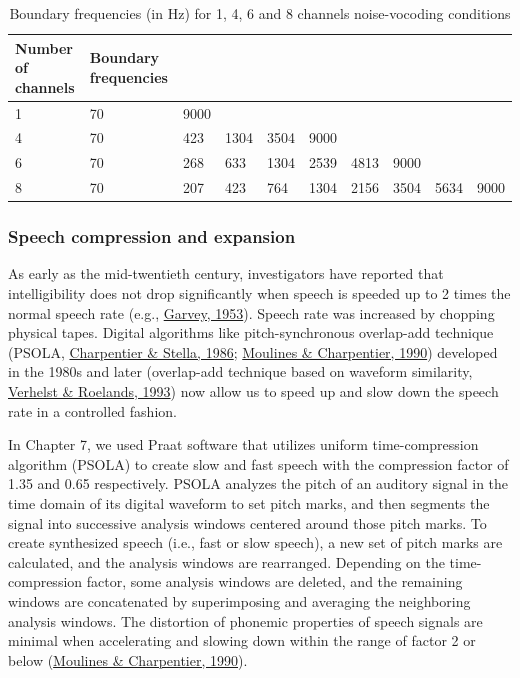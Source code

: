 \documentclass[a4paper, nobind]{templates/ociamthesis}
\begin{document}
\begin{table}[H]
\begin{center} 
\caption{Boundary frequencies (in Hz) for 1, 4, 6 and 8 channels noise-vocoding conditions} 
\label{frequencies} 
\vskip 0.12in
\begin{tabular}{llllllllll} 
\hline
Number of channels     &    Boundary frequencies \\
\hline
1   &   70    &   9000   &     &     &       &       &        &       &   \\

4   &   70    &   423   &   1304  &   3504  &   9000    &       &        &       &   \\

6   &   70    &   268   &   633   &   1304  &   2539    &   4813    &    9000    &       &   \\

8   &   70    &   207   &   423   &   764   &   1304    &   2156    &    3504    &   5634    &   9000\\
\hline
\end{tabular} 
\end{center} 
\end{table}

\hypertarget{compression-expansion}{%
\subsubsection{Speech compression and expansion}\label{compression-expansion}}

As early as the mid-twentieth century, investigators have reported that intelligibility does not drop significantly when speech is speeded up to 2 times the normal speech rate (e.g., \protect\hyperlink{ref-Garvey1953}{Garvey, 1953}).
Speech rate was increased by chopping physical tapes.
Digital algorithms like pitch-synchronous overlap-add technique (PSOLA, \protect\hyperlink{ref-Charpentier1986}{Charpentier \& Stella, 1986}; \protect\hyperlink{ref-Moulines1990}{Moulines \& Charpentier, 1990}) developed in the 1980s and later (overlap-add technique based on waveform similarity, \protect\hyperlink{ref-Verhelst1993}{Verhelst \& Roelands, 1993}) now allow us to speed up and slow down the speech rate in a controlled fashion.

In Chapter 7, we used Praat software that utilizes uniform time-compression algorithm (PSOLA) to create slow and fast speech with the compression factor of 1.35 and 0.65 respectively.
PSOLA analyzes the pitch of an auditory signal in the time domain of its digital waveform to set pitch marks, and then segments the signal into successive analysis windows centered around those pitch marks.
To create synthesized speech (i.e., fast or slow speech), a new set of pitch marks are calculated, and the analysis windows are rearranged.
Depending on the time-compression factor, some analysis windows are deleted, and the remaining windows are concatenated by superimposing and averaging the neighboring analysis windows.
The distortion of phonemic properties of speech signals are minimal when accelerating and slowing down within the range of factor 2 or below (\protect\hyperlink{ref-Moulines1990}{Moulines \& Charpentier, 1990}).
\end{document}
